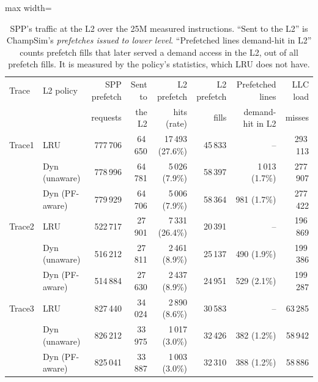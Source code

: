 \documentclass[11pt]{article}
\begin{document}
\begin{table}[H]
\centering
\small
\setlength{\tabcolsep}{4pt}
\begin{adjustbox}{max width=\textwidth}
\begin{tabular}{llrrrrrr}
\toprule
Trace & L2 policy & SPP prefetch & Sent to & L2 prefetch & L2 prefetch & Prefetched lines & LLC load \\
 & & requests & the L2 & hits (rate) & fills & demand-hit in L2 & misses \\
\midrule
Trace1 & LRU & 777\,706 & 64\,650 & 17\,493 (27.6\%) & 45\,833 & -- & 293\,113 \\
 & Dyn (unaware) & 778\,996 & 64\,781 & 5\,026 (7.9\%) & 58\,397 & 1\,013 (1.7\%) & 277\,907 \\
 & Dyn (PF-aware) & 779\,929 & 64\,706 & 5\,006 (7.9\%) & 58\,364 & 981 (1.7\%) & 277\,422 \\
\midrule
Trace2 & LRU & 522\,717 & 27\,901 & 7\,331 (26.4\%) & 20\,391 & -- & 196\,869 \\
 & Dyn (unaware) & 516\,212 & 27\,811 & 2\,461 (8.9\%) & 25\,137 & 490 (1.9\%) & 199\,386 \\
 & Dyn (PF-aware) & 514\,884 & 27\,630 & 2\,437 (8.9\%) & 24\,951 & 529 (2.1\%) & 199\,287 \\
\midrule
Trace3 & LRU & 827\,440 & 34\,024 & 2\,890 (8.6\%) & 30\,583 & -- & 63\,285 \\
 & Dyn (unaware) & 826\,212 & 33\,975 & 1\,017 (3.0\%) & 32\,426 & 382 (1.2\%) & 58\,942 \\
 & Dyn (PF-aware) & 825\,041 & 33\,887 & 1\,003 (3.0\%) & 32\,310 & 388 (1.2\%) & 58\,886 \\
\bottomrule
\end{tabular}
\end{adjustbox}
\caption{SPP's traffic at the L2 over the 25M measured instructions. ``Sent to the L2'' is
ChampSim's \emph{prefetches issued to lower level}. ``Prefetched lines demand-hit in L2'' counts
prefetch fills that later served a demand access in the L2, out of all prefetch fills. It is
measured by the policy's statistics, which LRU does not have.}
\label{tab:traffic}
\end{table}
\end{document}
